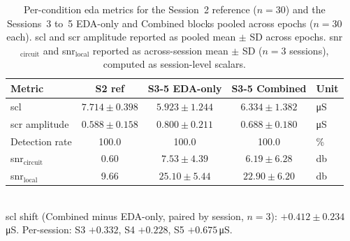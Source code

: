 \begin{table}[!htbp]
  \centering
  \caption{Per-condition \gls{eda} metrics for the Session~2 reference ($n = \num{30}$) and the Sessions~3 to~5 EDA-only and Combined blocks pooled across epochs ($n = \num{30}$ each). \gls{scl} and \gls{scr} amplitude reported as pooled mean $\pm$ SD across epochs. \gls{snr}$_{\text{circuit}}$ and \gls{snr}$_{\text{local}}$ reported as across-session mean $\pm$ SD ($n = 3$ sessions), computed as session-level scalars.}
  \label{tab:q5-eda-metrics}
  \begin{tabular}{l c c c l}
    \toprule
    \textbf{Metric} & \textbf{S2 ref} & \textbf{S3-5 EDA-only} & \textbf{S3-5 Combined} & \textbf{Unit} \\
    \midrule
    \gls{scl}                    & $\num{7.714} \pm \num{0.398}$ & $\num{5.923} \pm \num{1.244}$ & $\num{6.334} \pm \num{1.382}$ & \si{\micro\siemens} \\
    \gls{scr} amplitude          & $\num{0.588} \pm \num{0.158}$ & $\num{0.800} \pm \num{0.211}$ & $\num{0.688} \pm \num{0.180}$ & \si{\micro\siemens} \\
    Detection rate               & \num{100.0}                   & \num{100.0}                   & \num{100.0}                   & \si{\percent} \\
    \addlinespace
    \gls{snr}$_{\text{circuit}}$ & \num{0.60}                    & $\num{7.53} \pm \num{4.39}$   & $\num{6.19} \pm \num{6.28}$   & \si{\decibel} \\
    \gls{snr}$_{\text{local}}$   & \num{9.66}                    & $\num{25.10} \pm \num{5.44}$  & $\num{22.90} \pm \num{6.20}$  & \si{\decibel} \\
    \bottomrule
  \end{tabular}
  \\[0.5em]
  {\footnotesize \gls{scl} shift (Combined minus EDA-only, paired by session, $n = 3$): $+\num{0.412} \pm \num{0.234}$\,\si{\micro\siemens}. Per-session: S3 $+\num{0.332}$, S4 $+\num{0.228}$, S5 $+\num{0.675}$\,\si{\micro\siemens}.}
\end{table}
 
 
%
%
 
